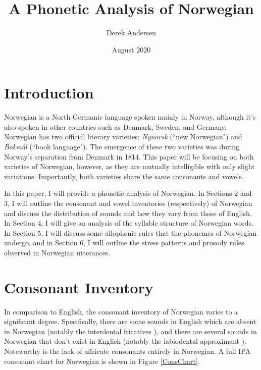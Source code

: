\documentclass{article}
\title{A Phonetic Analysis of Norwegian}
\author{Derek Andersen}
\date{August 2020}
\begin{document}
\maketitle

\section{Introduction}
Norwegian is a North Germanic language spoken mainly in Norway, although it's also spoken in other countries such as Denmark, Sweden, and Germany. Norwegian has two official literary varieties: \textit{Nynorsk} (``new Norwegian") and \textit{Bokmål} (``book language"). The emergence of these two varieties was during Norway's separation from Denmark in 1814. This paper will be focusing on both varieties of Norwegian, however, as they are mutually intelligible with only slight variations. Importantly, both varieties share the same consonants and vowels. \cite{Omniglot}  

In this paper, I will provide a phonetic analysis of Norwegian. In Sections 2 and 3, I will outline the consonant and vowel inventories (respectively) of Norwegian and discuss the distribution of sounds and how they vary from those of English. In Section 4, I will give an analysis of the syllable structure of Norwegian words. In Section 5, I will discuss some allophonic rules that the phonemes of Norwegian undergo, and in Section 6, I will outline the stress patterns and prosody rules observed in Norwegian utterances.

\section{Consonant Inventory}
In comparison to English, the consonant inventory of Norwegian varies to a significant degree. Specifically, there are some sounds in English which are absent in Norwegian (notably the interdental fricatives ), and there are several sounds in Norwegian that don't exist in English (notably the labiodental approximant ). \cite{LearnNorwegian} Noteworthy is the lack of affricate consonants entirely in Norwegian. A full IPA consonant chart for Norwegian is shown in Figure \ref{ConsChart}.
\end{document}
